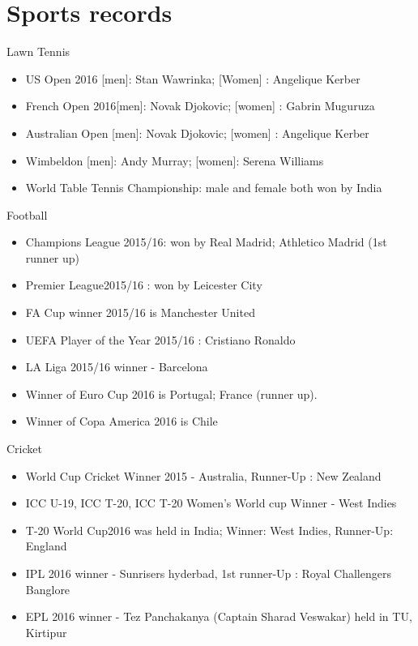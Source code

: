 \documentclass[
  openany]{book}
\providecommand{\tightlist}{%
  \setlength{\itemsep}{0pt}\setlength{\parskip}{0pt}}
\begin{document}
\hypertarget{sports-records}{%
\section{Sports records}\label{sports-records}}

Lawn Tennis

\begin{itemize}
\tightlist
\item
  US Open 2016 {[}men{]}: Stan Wawrinka; {[}Women{]} : Angelique Kerber
\item
  French Open 2016{[}men{]}: Novak Djokovic; {[}women{]} : Gabrin Muguruza
\item
  Australian Open {[}men{]}: Novak Djokovic; {[}women{]} : Angelique Kerber
\item
  Wimbeldon {[}men{]}: Andy Murray; {[}women{]}: Serena Williams\\
\item
  World Table Tennis Championship: male and female both won by India
\end{itemize}

Football

\begin{itemize}
\tightlist
\item
  Champions League 2015/16: won by Real Madrid; Athletico Madrid (1st runner up)
\item
  Premier League2015/16 : won by Leicester City
\item
  FA Cup winner 2015/16 is Manchester United
\item
  UEFA Player of the Year 2015/16 : Cristiano Ronaldo
\item
  LA Liga 2015/16 winner - Barcelona
\item
  Winner of Euro Cup 2016 is Portugal; France (runner up).
\item
  Winner of Copa America 2016 is Chile
\end{itemize}

Cricket

\begin{itemize}
\tightlist
\item
  World Cup Cricket Winner 2015 - Australia, Runner-Up : New Zealand
\item
  ICC U-19, ICC T-20, ICC T-20 Women's World cup Winner - West Indies
\item
  T-20 World Cup2016 was held in India; Winner: West Indies, Runner-Up: England
\item
  IPL 2016 winner - Sunrisers hyderbad, 1st runner-Up : Royal Challengers Banglore
\item
  EPL 2016 winner - Tez Panchakanya (Captain Sharad Veswakar) held in TU, Kirtipur
\end{itemize}
\end{document}
